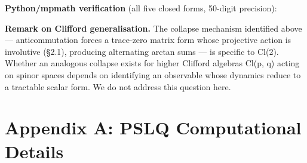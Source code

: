 \documentclass[11pt]{article}
\begin{document}
\textbf{Python/mpmath verification} (all five closed forms, 50-digit
precision):

\begin{Shaded}
\begin{Highlighting}[]
\OperatorTok{;}\OperatorTok{=} 
\OperatorTok{=}\OperatorTok{+}\OperatorTok{/}\NormalTok{)}\OperatorTok{/}\OperatorTok{+}\OperatorTok{/}\NormalTok{)}
 \OperatorTok{/}
\OperatorTok{=}\NormalTok{,}\NormalTok{))}\OperatorTok{;}\OperatorTok{=}\NormalTok{,}\NormalTok{))}
\OperatorTok{=}\OperatorTok{+}\OperatorTok{/}\NormalTok{)}\OperatorTok{/}\OperatorTok{+}\OperatorTok{/}\NormalTok{))}
\OperatorTok{=}\OperatorTok{{-}}\OperatorTok{/}\NormalTok{)}\OperatorTok{/}\OperatorTok{{-}}\OperatorTok{/}\NormalTok{))}
\OperatorTok{+}
\end{Highlighting}
\end{Shaded}

\textbf{Remark on Clifford generalisation.} The collapse mechanism
identified above --- anticommutation forces a trace-zero matrix form
whose projective action is involutive (§2.1), producing alternating
arctan sums --- is specific to Cl(2). Whether an analogous collapse
exists for higher Clifford algebras Cl(p, q) acting on spinor spaces
depends on identifying an observable whose dynamics reduce to a
tractable scalar form. We do not address this question here.

\hypertarget{appendix-a-pslq-computational-details}{%
\section{Appendix A: PSLQ Computational
Details}\label{appendix-a-pslq-computational-details}}
\end{document}

